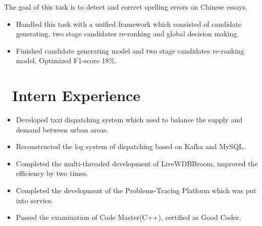 \documentclass{resume}
\begin{document}
The goal of this task is to detect and correct spelling errors on Chinese essays.
\begin{itemize}
  \item Handled this task with a unified framework which consisted of candidate generating, two stage candidates re-ranking and global decision making.
  \item Finished candidate generating model and two stage candidates re-ranking model. Optimized F1-score 18\%.
\end{itemize}

\section{\faSitemap\ Intern Experience}

\begin{itemize}
  \item Developed taxi dispatching system which used to balance the supply and demand between urban areas.
  \item Reconstructed the log system of dispatching based on Kafka and MySQL.
\end{itemize}

\begin{itemize}
  \item Completed the multi-threaded development of LiveWDBBroom, improved the efficiency by two times.
  \item Completed the development of the Problems-Tracing Platform which was put into service.
  \item Passed the examination of Code Master(C++), certified as Good Coder.
\end{itemize}


\end{document}
